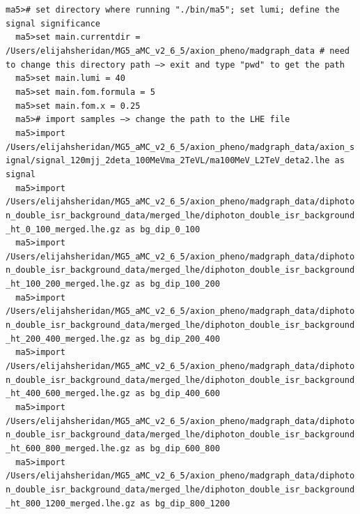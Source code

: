 \documentclass[a4paper, 10pt]{article}
\begin{document}
\texttt{ma5>\# set directory where running "./\-bin/\-ma5"; set lumi; define the signal significance\\
}
\texttt{ }\texttt{ }\texttt{ma5>set main.currentdir = /\-Users/\-elijahsheridan/\-MG5\_aMC\_v2\_6\_5/\-axion\_pheno/\-madgraph\_data \# need to change this directory path --> exit and type "pwd" to get the path\\
}
\texttt{ }\texttt{ }\texttt{ma5>set main.lumi = 40\\
}
\texttt{ }\texttt{ }\texttt{ma5>set main.fom.formula = 5\\
}
\texttt{ }\texttt{ }\texttt{ma5>set main.fom.x = 0.25\\
}
\texttt{ }\texttt{ }\texttt{ma5>\# import samples --> change the path to the LHE file\\
}
\texttt{ }\texttt{ }\texttt{ma5>import /\-Users/\-elijahsheridan/\-MG5\_aMC\_v2\_6\_5/\-axion\_pheno/\-madgraph\_data/\-axion\_signal/\-signal\_120mjj\_2deta\_100MeVma\_2TeVL/\-ma100MeV\_L2TeV\_deta2.lhe as signal\\
}
\texttt{ }\texttt{ }\texttt{ma5>import /\-Users/\-elijahsheridan/\-MG5\_aMC\_v2\_6\_5/\-axion\_pheno/\-madgraph\_data/\-diphoton\_double\_isr\_background\_data/\-merged\_lhe/\-diphoton\_double\_isr\_background\_ht\_0\_100\_merged.lhe.gz as bg\_dip\_0\_100\\
}
\texttt{ }\texttt{ }\texttt{ma5>import /\-Users/\-elijahsheridan/\-MG5\_aMC\_v2\_6\_5/\-axion\_pheno/\-madgraph\_data/\-diphoton\_double\_isr\_background\_data/\-merged\_lhe/\-diphoton\_double\_isr\_background\_ht\_100\_200\_merged.lhe.gz as bg\_dip\_100\_200\\
}
\texttt{ }\texttt{ }\texttt{ma5>import /\-Users/\-elijahsheridan/\-MG5\_aMC\_v2\_6\_5/\-axion\_pheno/\-madgraph\_data/\-diphoton\_double\_isr\_background\_data/\-merged\_lhe/\-diphoton\_double\_isr\_background\_ht\_200\_400\_merged.lhe.gz as bg\_dip\_200\_400\\
}
\texttt{ }\texttt{ }\texttt{ma5>import /\-Users/\-elijahsheridan/\-MG5\_aMC\_v2\_6\_5/\-axion\_pheno/\-madgraph\_data/\-diphoton\_double\_isr\_background\_data/\-merged\_lhe/\-diphoton\_double\_isr\_background\_ht\_400\_600\_merged.lhe.gz as bg\_dip\_400\_600\\
}
\texttt{ }\texttt{ }\texttt{ma5>import /\-Users/\-elijahsheridan/\-MG5\_aMC\_v2\_6\_5/\-axion\_pheno/\-madgraph\_data/\-diphoton\_double\_isr\_background\_data/\-merged\_lhe/\-diphoton\_double\_isr\_background\_ht\_600\_800\_merged.lhe.gz as bg\_dip\_600\_800\\
}
\texttt{ }\texttt{ }\texttt{ma5>import /\-Users/\-elijahsheridan/\-MG5\_aMC\_v2\_6\_5/\-axion\_pheno/\-madgraph\_data/\-diphoton\_double\_isr\_background\_data/\-merged\_lhe/\-diphoton\_double\_isr\_background\_ht\_800\_1200\_merged.lhe.gz as bg\_dip\_800\_1200\\
}
\end{document}
